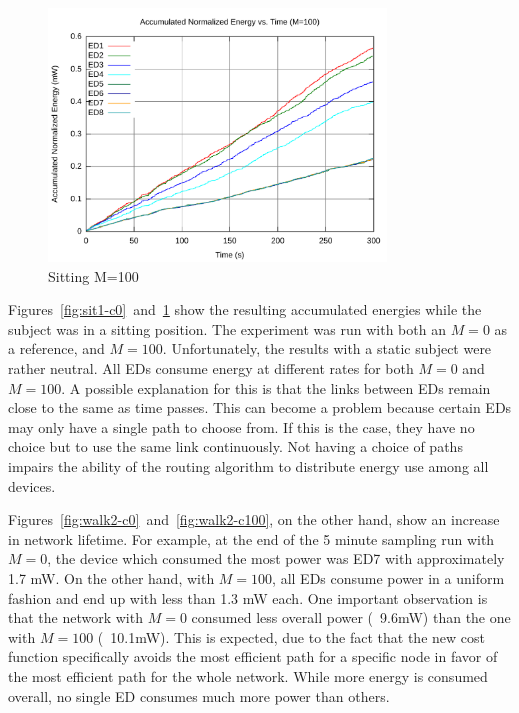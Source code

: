 \documentclass{article}
\begin{document}
\begin{figure}[!htb]
\includegraphics[width=0.8\textwidth]{figures/sit1-c100.pdf}
\caption{Sitting M=100}
\label{fig:sit1-c100}
\end{figure}

Figures~\ref{fig:sit1-c0}~and~\ref{fig:sit1-c100} show the resulting accumulated energies while the subject was in a sitting position. The experiment was run with both an $M=0$ as a reference, and $M=100$. Unfortunately, the results with a static subject were rather neutral. All EDs consume energy at different rates for both $M=0$ and $M=100$. A possible explanation for this is that the links between EDs remain close to the same as time passes. This can become a problem because certain EDs may only have a single path to choose from. If this is the case, they have no choice but to use the same link continuously. Not having a choice of paths impairs the ability of the routing algorithm to distribute energy use among all devices.

Figures~\ref{fig:walk2-c0}~and~\ref{fig:walk2-c100}, on the other hand, show an increase in network lifetime. For example, at the end of the 5 minute sampling run with $M=0$, the device which consumed the most power was ED7 with approximately 1.7 mW. On the other hand, with $M=100$, all EDs consume power in a uniform fashion and end up with less than 1.3 mW each. One important observation is that the network with $M=0$ consumed less overall power (~9.6mW) than the one with $M=100$ (~10.1mW). This is expected, due to the fact that the new cost function specifically avoids the most efficient path for a specific node in favor of the most efficient path for the whole network. While more energy is consumed overall, no single ED consumes much more power than others. 
\end{document}
